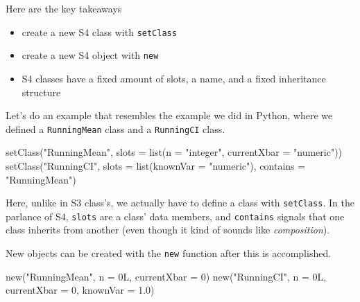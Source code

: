 \documentclass[
  12pt,
  krantz2]{krantz}
\makeatletter
\newenvironment{Shaded}{\begin{snugshade}}{\end{snugshade}}
\newcommand{\AttributeTok}[1]{\textcolor[rgb]{0.61,0.61,0.61}{#1}}
\newcommand{\DecValTok}[1]{\textcolor[rgb]{0.06,0.06,0.06}{#1}}
\newcommand{\FloatTok}[1]{\textcolor[rgb]{0.06,0.06,0.06}{#1}}
\newcommand{\FunctionTok}[1]{\textcolor[rgb]{0,0,0}{#1}}
\newcommand{\NormalTok}[1]{#1}
\newcommand{\StringTok}[1]{\textcolor[rgb]{0.5,0.5,0.5}{#1}}
\providecommand{\tightlist}{%
  \setlength{\itemsep}{0pt}\setlength{\parskip}{0pt}}
\newenvironment{kframe}{%
\medskip{}
\setlength{\fboxsep}{.8em}
 \def\at@end@of@kframe{}%
 \ifinner\ifhmode%
  \def\at@end@of@kframe{\end{minipage}}%
  \begin{minipage}{\columnwidth}%
 \fi\fi%
 \def\FrameCommand##1{\hskip\@totalleftmargin \hskip-\fboxsep
 \colorbox{shadecolor}{##1}\hskip-\fboxsep
     \hskip-\linewidth \hskip-\@totalleftmargin \hskip\columnwidth}%
 \MakeFramed {\advance\hsize-\width
   \@totalleftmargin\z@ \linewidth\hsize
   \@setminipage}}%
 {\par\unskip\endMakeFramed%
 \at@end@of@kframe}
\renewenvironment{Shaded}{\begin{kframe}}{\end{kframe}}
\makeatother
\begin{document}
Here are the key takeaways

\begin{itemize}
\tightlist
\item
  create a new S4 class with \texttt{setClass}
\item
  create a new S4 object with \texttt{new}
\item
  S4 classes have a fixed amount of slots, a name, and a fixed inheritance structure
\end{itemize}

Let's do an example that resembles the example we did in Python, where we defined a \texttt{RunningMean} class and a \texttt{RunningCI} class.

\begin{Shaded}
\begin{Highlighting}[]
\FunctionTok{setClass}\NormalTok{(}\StringTok{"RunningMean"}\NormalTok{,}
         \AttributeTok{slots =} \FunctionTok{list}\NormalTok{(}\AttributeTok{n =} \StringTok{"integer"}\NormalTok{, }
                      \AttributeTok{currentXbar =} \StringTok{"numeric"}\NormalTok{))}
\FunctionTok{setClass}\NormalTok{(}\StringTok{"RunningCI"}\NormalTok{,}
         \AttributeTok{slots =} \FunctionTok{list}\NormalTok{(}\AttributeTok{knownVar =} \StringTok{"numeric"}\NormalTok{),}
         \AttributeTok{contains =} \StringTok{"RunningMean"}\NormalTok{)}
\end{Highlighting}
\end{Shaded}

Here, unlike in S3 class's, we actually have to define a class with \texttt{setClass}. In the parlance of S4, \texttt{slots} are a class' data members, and \texttt{contains} signals that one class inherits from another (even though it kind of sounds like \emph{composition}).

New objects can be created with the \texttt{new} function after this is accomplished.

\begin{Shaded}
\begin{Highlighting}[]
\FunctionTok{new}\NormalTok{(}\StringTok{"RunningMean"}\NormalTok{, }\AttributeTok{n =}\NormalTok{ 0L, }\AttributeTok{currentXbar =} \DecValTok{0}\NormalTok{)}
\FunctionTok{new}\NormalTok{(}\StringTok{"RunningCI"}\NormalTok{, }\AttributeTok{n =}\NormalTok{ 0L, }\AttributeTok{currentXbar =} \DecValTok{0}\NormalTok{, }\AttributeTok{knownVar =} \FloatTok{1.0}\NormalTok{)}
\end{Highlighting}
\end{Shaded}
\end{document}
